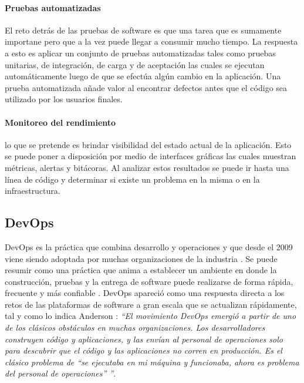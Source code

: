 \paragraph{Pruebas automatizadas} El reto detrás de las pruebas de software es que una tarea que es sumamente importane pero que a la vez puede llegar a consumir mucho tiempo. La respuesta a esto es aplicar un conjunto de pruebas automatizadas tales como pruebas unitarias, de integración, de carga y de aceptación las cuales se ejecutan automáticamente luego de que se efectúa algún cambio en la aplicación. Una prueba automatizada añade valor al encontrar defectos antes que el código sea utilizado por los usuarios finales\cite{humble}.

\paragraph{Monitoreo del rendimiento} lo que se pretende es brindar visibilidad del estado actual de la aplicación. Esto se puede poner a disposición por medio de interfaces gráficas las cuales muestran métricas, alertas y bitácoras. Al analizar estos resultados se puede ir hasta una línea de código y determinar si existe un problema en la misma o en la infraestructura\cite{humble}.


\subsection{DevOps}
DevOps es la práctica que combina desarrollo y operaciones y que desde el 2009 viene siendo adoptada por muchas organizaciones de la industria \cite{bang-et-al}. Se puede resumir como una práctica que anima a establecer un ambiente en donde la construcción, pruebas y la entrega de software puede realizarse de forma rápida, frecuente y más confiable \cite{henrik-b}. DevOps apareció como una respuesta directa a los retos de las plataformas de software a gran escala que se actualizan rápidamente, tal y como lo indica Anderson \cite{anderson}: \emph{``El movimiento DevOps emergió a partir de uno de los clásicos obstáculos en muchas organizaciones. Los desarrolladores construyen código y aplicaciones, y las envían al personal de operaciones solo para descubrir que el código y las aplicaciones no corren en producción. Es el clásico problema de ``se ejecutaba en mi máquina y funcionaba, ahora es problema del personal de operaciones'' ''}. 

